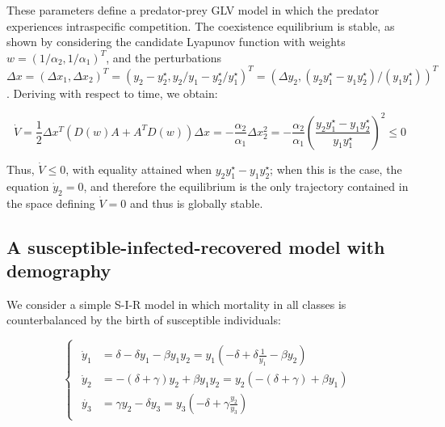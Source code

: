 \documentclass{article}
\begin{document}
These parameters define a predator-prey GLV model in which the predator
experiences intraspecific competition. The coexistence equilibrium is
stable, as shown by considering the candidate Lyapunov function with
weights \(w = (1/\alpha_2,1/\alpha_1)^T\), and the perturbations
\(\Delta x = (\Delta x_1, \Delta x_2)^T = (y_2 - y_2^\star, y_2/y_1 - y_2^\star / y_1^\star)^T = (\Delta y_2, (y_2 y_1^\star - y_1 y_2^\star)/(y_1 y_1^\star))^T\).
Deriving with respect to time, we obtain:

\begin{equation}
\dot{V} = \frac{1}{2} \Delta x^T (D(w) A + A^T D(w)) \Delta x =  - \frac{\alpha_2}{\alpha_1} \Delta x_2^2 = -\frac{\alpha_2}{\alpha_1} \left( \frac{y_2 y_1^\star - y_1 y_2^\star}{y_1 y_1^\star}\right)^2\leq 0
\end{equation}

Thus, \(\dot{V} \leq 0\), with equality attained when
\(y_2 y_1^\star - y_1 y_2^\star\); when this is the case, the equation
\(\dot{y}_2 = 0\), and therefore the equilibrium is the only trajectory
contained in the space defining \(\dot{V} = 0\) and thus is globally
stable.

\hypertarget{a-susceptible-infected-recovered-model-with-demography}{%
\subsection{A susceptible-infected-recovered model with
demography}\label{a-susceptible-infected-recovered-model-with-demography}}

\label{sec:sir}

We consider a simple S-I-R model in which mortality in all classes is
counterbalanced by the birth of susceptible individuals:

\begin{equation}
\label{eq:sir}
\begin{cases}
\begin{aligned}
\dot{y}_1 &= \delta - \delta y_1 - \beta y_1 y_2 = y_1 \left(-\delta + \delta \frac{1}{y_1} - \beta y_2 \right)\\
\dot{y}_2 &= - (\delta + \gamma) y_2 + \beta y_1 y_2 = y_2 \left(-(\delta + \gamma) + \beta y_1 \right)\\
\dot{y_3} &= \gamma y_2 - \delta y_3 = y_3 \left(-\delta + \gamma \frac{y_2}{y_3} \right)
\end{aligned}
\end{cases}
\end{equation}
\end{document}
